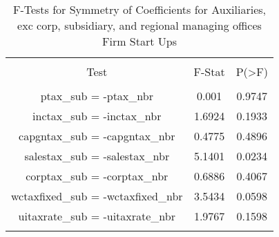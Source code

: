 
\begin{table}[!htbp] \centering 
  \caption{F-Tests for Symmetry of Coefficients for Auxiliaries, exc corp, subsidiary, and regional managing offices Firm Start Ups} 
  \label{95Ftests} 
\begin{tabular}{@{\extracolsep{5pt}} ccc} 
\\[-1.8ex]\hline 
\hline \\[-1.8ex] 
Test & F-Stat & P(\textgreater F) \\ 
\hline \\[-1.8ex] 
ptax\_sub = -ptax\_nbr & 0.001 & 0.9747 \\ 
inctax\_sub = -inctax\_nbr & 1.6924 & 0.1933 \\ 
capgntax\_sub = -capgntax\_nbr & 0.4775 & 0.4896 \\ 
salestax\_sub = -salestax\_nbr & 5.1401 & 0.0234 \\ 
corptax\_sub = -corptax\_nbr & 0.6886 & 0.4067 \\ 
wctaxfixed\_sub = -wctaxfixed\_nbr & 3.5434 & 0.0598 \\ 
uitaxrate\_sub = -uitaxrate\_nbr & 1.9767 & 0.1598 \\ 
\hline \\[-1.8ex] 
\end{tabular} 
\end{table} 
